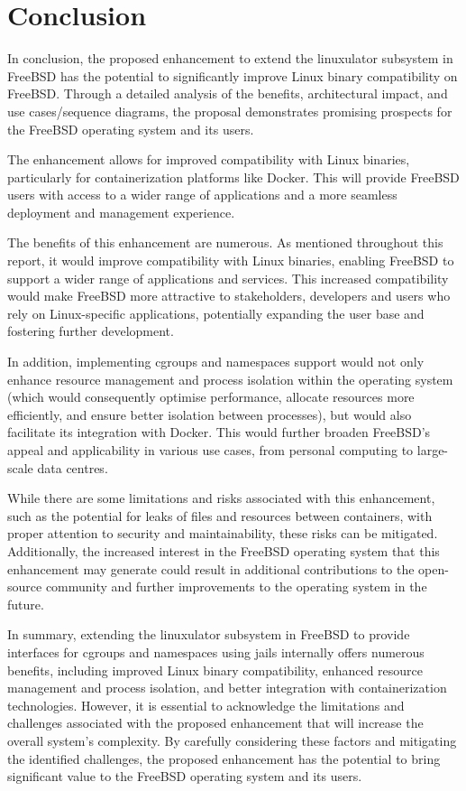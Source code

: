 \documentclass[12pt, dvipsnames, a4paper]{article}
\begin{document}
\section{Conclusion}
In conclusion, the proposed enhancement to extend the linuxulator subsystem in FreeBSD has the potential to significantly improve Linux binary compatibility on FreeBSD. Through a detailed analysis of the benefits, architectural impact, and use cases/sequence diagrams, the proposal demonstrates promising prospects for the FreeBSD operating system and its users.

The enhancement allows for improved compatibility with Linux binaries, particularly for containerization platforms like Docker. This will provide FreeBSD users with access to a wider range of applications and a more seamless deployment and management experience.

The benefits of this enhancement are numerous. As mentioned throughout this report, it would improve compatibility with Linux binaries, enabling FreeBSD to support a wider range of applications and services. This increased compatibility would make FreeBSD more attractive to stakeholders, developers and users who rely on Linux-specific applications, potentially expanding the user base and fostering further development.

In addition, implementing cgroups and namespaces support would not only enhance resource management and process isolation within the operating system (which would consequently optimise performance, allocate resources more efficiently, and ensure better isolation between processes), but would also facilitate its integration with Docker. This would further broaden FreeBSD's appeal and applicability in various use cases, from personal computing to large-scale data centres.

While there are some limitations and risks associated with this enhancement, such as the potential for leaks of files and resources between containers, with proper attention to security and maintainability, these risks can be mitigated. Additionally, the increased interest in the FreeBSD operating system that this enhancement may generate could result in additional contributions to the open-source community and further improvements to the operating system in the future.

In summary, extending the linuxulator subsystem in FreeBSD to provide interfaces for cgroups and namespaces using jails internally offers numerous benefits, including improved Linux binary compatibility, enhanced resource management and process isolation, and better integration with containerization technologies. However, it is essential to acknowledge the limitations and challenges associated with the proposed enhancement that will increase the overall system's complexity. By carefully considering these factors and mitigating the identified challenges, the proposed enhancement has the potential to bring significant value to the FreeBSD operating system and its users.
\end{document}
